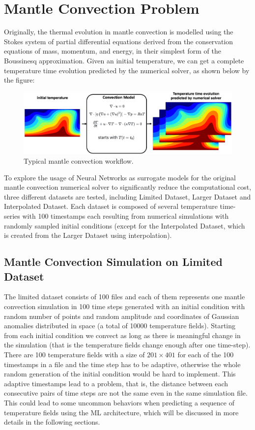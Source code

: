 \chapter{Mantle Convection Problem}\label{chap:evaluation}

Originally, the thermal evolution in mantle convection is modelled using the Stokes system of partial differential equations derived from the conservation equations of mass, momentum, and energy, in their simplest form of the Boussinesq approximation. Given an initial temperature, we can get a complete temperature time evolution predicted by the numerical solver, as shown below by the figure:

\begin{figure}[H]
    \caption{Typical mantle convection workflow.}
    \includegraphics[scale=0.15]{figures/mantle_convection_images/Mantle_Convection_workflow.png}
\end{figure}

To explore the usage of Neural Networks as surrogate models for the original mantle convection numerical solver to significantly reduce the computational
cost, three different datasets are tested, including Limited Dataset, Larger Dataset and Interpolated Dataset. Each dataset is composed of several temperature time-series with 100 timestamps each resulting from numerical simulations with randomly sampled initial conditions (except for the Interpolated Dataset, which is created from the Larger Dataset using interpolation).

\section{Mantle Convection Simulation on Limited Dataset}

The limited dataset consists of 100 files and each of them represents one mantle convection simulation in 100 time steps generated with an initial condition with random number of points and random amplitude and coordinates of Gaussian anomalies distributed in space (a total of 10000 temperature fields). Starting from each initial condition we convect as long as there is meaningful change in the simulation (that is the temperature fields change enough after one time-step). There are 100 temperature fields with a size of $201 \times 401$ for each of the 100 timestamps in a file and the time step has to be adaptive, otherwise the whole random generation of the initial condition would be hard to implement. This adaptive timestamps lead to a problem, that is, the distance between each consecutive pairs of time steps are not the same even in the same simulation file. This could lead to some uncommon behaviors when predicting a sequence of temperature fields using the ML architecture, which will be discussed in more details in the following sections.

